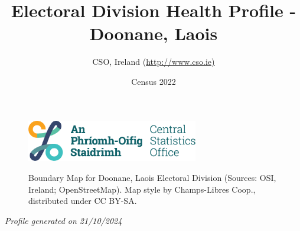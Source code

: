 \documentclass{article}
\title{Electoral Division Health Profile - Doonane, Laois}
\date{Census 2022}
\author{CSO, Ireland  (\url{http://www.cso.ie)}}
\begin{document}


\begin{figure}
	\centering
\includegraphics[width =75mm]{../figures/CSO_Logo.png}
\end{figure}

\begin{figure}[h]
	\centering
	\setlength{\fboxsep}{1pt}
	\caption{\normalsize Boundary Map for Doonane, Laois Electoral Division (Sources: OSI, Ireland; OpenStreetMap). Map style by Champs-Libres Coop., distributed under CC BY-SA.}
	\label{fig:2ae19629-1a6a-13a3-e055-000000000001}
	\end{figure}
	{\let\newpage\relax\maketitle}
	     \begin{center}
         \emph{Profile generated on 21/10/2024}
     \end{center}
\end{document}
